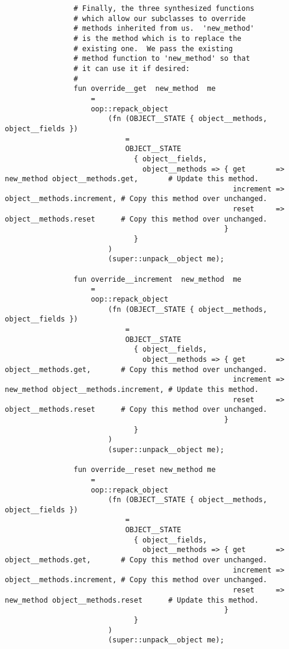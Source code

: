 \begin{verbatim}
                # Finally, the three synthesized functions
                # which allow our subclasses to override
                # methods inherited from us.  'new_method'
                # is the method which is to replace the
                # existing one.  We pass the existing
                # method function to 'new_method' so that
                # it can use it if desired:
                #
                fun override__get  new_method  me
                    =
                    oop::repack_object
                        (fn (OBJECT__STATE { object__methods, object__fields })
                            =
                            OBJECT__STATE
                              { object__fields,
                                object__methods => { get       => new_method object__methods.get,       # Update this method.
                                                     increment =>            object__methods.increment, # Copy this method over unchanged.
                                                     reset     =>            object__methods.reset      # Copy this method over unchanged.
                                                   }
                              }
                        )
                        (super::unpack__object me);

                fun override__increment  new_method  me
                    =
                    oop::repack_object
                        (fn (OBJECT__STATE { object__methods, object__fields })
                            =
                            OBJECT__STATE
                              { object__fields,
                                object__methods => { get       =>            object__methods.get,       # Copy this method over unchanged.
                                                     increment => new_method object__methods.increment, # Update this method.
                                                     reset     =>            object__methods.reset      # Copy this method over unchanged.
                                                   }
                              }
                        )
                        (super::unpack__object me);

                fun override__reset new_method me
                    =
                    oop::repack_object
                        (fn (OBJECT__STATE { object__methods, object__fields })
                            =
                            OBJECT__STATE
                              { object__fields,
                                object__methods => { get       =>            object__methods.get,       # Copy this method over unchanged.
                                                     increment =>            object__methods.increment, # Copy this method over unchanged. 
                                                     reset     => new_method object__methods.reset      # Update this method.
                                                   }
                              }
                        )
                        (super::unpack__object me);



\end{verbatim}

